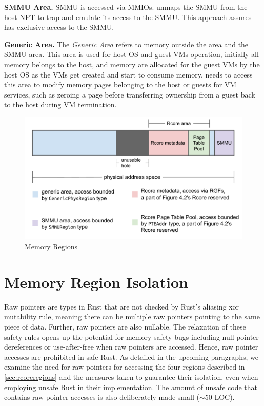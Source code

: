 \textbf{SMMU Area.}
SMMU is accessed via MMIOs. \rustcore{} unmaps the SMMU
from the host NPT to trap-and-emulate its access to the SMMU. This
approach assures \rustcore{} has exclusive access to the SMMU.

\textbf{Generic Area.}
The \textit{Generic Area} refers to memory outside the \rustcore{} area and the SMMU area.
This area is used for host OS and guest VMs operation, initially all memory
belongs to the host, and memory are allocated for the guest VMs by the host OS
as the VMs get created and start to consume memory.
\rustcore{} needs to access this area to modify memory pages
belonging to the host or guests for VM services, such as zeroing a page
before transferring ownership from a guest back to the host during VM termination.

\begin{figure}[ht]
\centering
\includegraphics[width=1.00\textwidth]{figures/regions.pdf}
\caption{Memory Regions}
\label{fig:regions}
\end{figure}

\section{Memory Region Isolation}
\label{sec:memiso}

Raw pointers are types in Rust that are not checked by Rust's aliasing xor
mutability rule, meaning there can be multiple raw pointers pointing to the
same piece of data. Further, raw pointers are also nullable. The relaxation of
these safety rules opens up the potential for memory safety bugs including
null pointer dereferences or use-after-free when raw pointers are accessed.
Hence, raw pointer accesses are prohibited in safe Rust.
As detailed in the upcoming paragraphs, we examine the need for raw pointers
for accessing the four regions described in \autoref{sec:rcoreregions} and the
measures taken to guarantee their isolation, even when employing unsafe Rust in
their implementation. The amount of unsafe code that contains raw pointer
accesses is also deliberately made small ($\sim$50 LOC).

